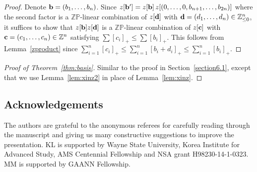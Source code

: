 \documentclass[pdftex]{sigma}
\numberwithin{equation}{section}
\begin{document}
\begin{proof}
Denote ${\bf b}=(b_1,\dots,b_n)$. Since
$z[{\bf b}']=z[{\bf b}] \, z[(0,\dots,0,b_{n+1},\dots,b_{2n})]$ where the second factor is a $\mathbb{ZP}$-linear combination of $z[{\bf d}]$ with ${\bf d}=(d_1,\dots,d_n)\in \mathbb{Z}_{\le 0}^n$, it suf\/f\/ices to show that $z[{\bf b}]z[{\bf d}]$ is a $\mathbb{ZP}$-linear combination of  $z[{\bf c}]$ with ${\bf c}=(c_1,\dots,c_n)\in \mathbb{Z}^n$ satisfying $\sum[c_i]_+\le \sum[b_i]_+$. This follows from Lemma~\ref{zproduct} since $\sum\limits_{i=1}^n[c_i]_+ \le \sum\limits_{i=1}^n [b_i+d_i]_+\le \sum\limits_{i=1}^n [b_i]_+$.
\end{proof}


\begin{proof}[Proof of Theorem~\ref{thm:basis}]
Similar to the proof in Section~\ref{section6.1}, except that we use  Lemma~\ref{lem:xinz2} in place of Lemma~\ref{lem:xinz}.
\end{proof}


\subsection*{Acknowledgements}

The authors are grateful to the anonymous referees for carefully reading through the manuscript and giving us many constructive suggestions to improve the presentation. KL is supported by  Wayne State University, Korea Institute for Advanced Study, AMS Centennial Fellowship and NSA grant H98230-14-1-0323.
MM is supported by GAANN Fellowship.

\end{document}
